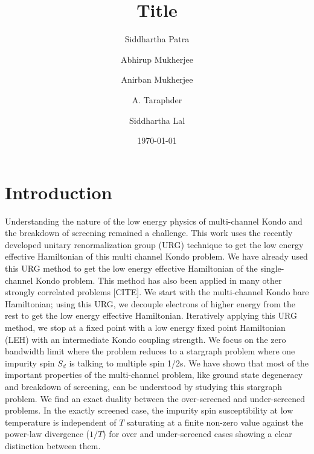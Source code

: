 \documentclass[reprint,prb,superscriptaddress]{revtex4-1}
\begin{document}
\title{Title}
\author{Siddhartha Patra}
\author{Abhirup Mukherjee}
\author{Anirban Mukherjee}
\author{A. Taraphder}
\author{Siddhartha Lal}
\date{\today}
\begin{abstract}
	\lipsum[1-2]
\end{abstract}
\maketitle

\tableofcontents

\section{Introduction}

Understanding the nature of the low energy physics of multi-channel Kondo and the breakdown of screening remained a challenge. This work uses the recently developed unitary renormalization group (URG) technique to get the low energy effective Hamiltonian of this multi channel Kondo problem. We have already used this URG method to get the low energy effective Hamiltonian of the single-channel Kondo problem. This method has also been applied in many other strongly correlated problems [CITE]. We start with the multi-channel Kondo bare Hamiltonian; using this URG, we decouple electrons of higher energy from the rest to get the low energy effective Hamiltonian. Iteratively applying this URG method, we stop at a fixed point with a low energy fixed point Hamiltonian (LEH) with an intermediate Kondo coupling strength. We focus on the zero bandwidth limit where the problem reduces to a stargraph problem where one impurity spin $S_d$ is talking to multiple spin 1/2s. We have shown that most of the important properties of the multi-channel problem, like ground state degeneracy and breakdown of screening, can be understood by studying this stargraph problem. We find an exact duality between the over-screened and under-screened problems. In the exactly screened case, the impurity spin susceptibility at low temperature is independent of $T$ saturating at a finite non-zero value against the power-law divergence ($1/T$) for over and under-screened cases showing a clear distinction between them.
\end{document}
